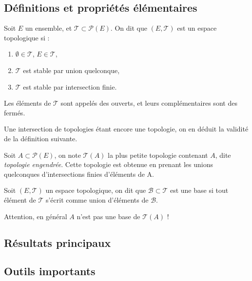 \documentclass[12pt,a4paper]{article}
\begin{document}

\subsection*{Définitions et propriétés élémentaires}
\begin{definstar}
Soit $E$ un ensemble, et $\mathcal{T} \subset \mathcal{P}(E)$.  On dit que $(E,\mathcal{T})$ est un espace topologique si :
\begin{enumerate}
\item $\emptyset \in \mathcal{T}$, $E \in \mathcal{T}$,
\item $\mathcal{T}$ est stable par union quelconque,
\item $\mathcal{T}$ est stable par intersection finie.
\end{enumerate}
Les éléments de $\mathcal{T}$ sont appelés des ouverts, et leurs complémentaires sont des fermés.
\end{definstar}
\begin{rmq}
Une intersection de topologies étant encore une topologie, on en déduit la validité de la définition suivante.
\end{rmq}
\begin{definstar}
Soit $A \subset \mathcal{P}(E)$, on note $\mathcal{T}(A)$ la plus petite topologie contenant $A$, dite \textit{topologie engendrée}. Cette topologie est obtenue en prenant les unions quelconques d'intersections finies
d'éléments de A.
\end{definstar}

\begin{definstar}
Soit $(E,\mathcal{T})$ un espace topologique, on dit que $\mathcal{B}\subset \mathcal{T}$ est une base si tout élément de $\mathcal{T}$ s'écrit comme union d'éléments de $\mathcal{B}$.
\end{definstar}
\begin{rmq}
Attention, en général $A$ n'est pas une base de $\mathcal{T}(A)$ !
\end{rmq}

\subsection*{Résultats principaux}

\subsection*{Outils importants}
\end{document}
